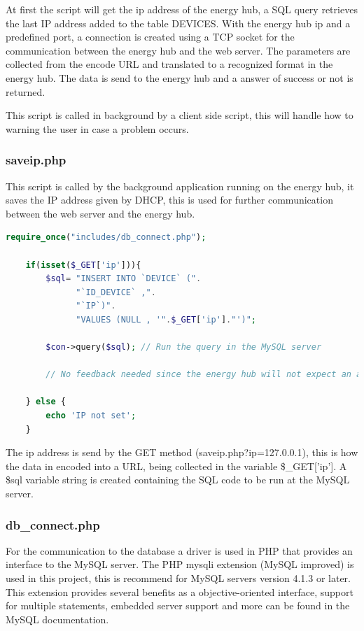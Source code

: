 At first the script will get the ip address of the energy hub, a SQL query retrieves the last IP address added to the table DEVICES. With the energy hub ip and a predefined port, a connection is created using a TCP socket for the communication between the energy hub and the web server. The parameters are collected from the encode URL and translated to a recognized format in the energy hub. The data is send to the energy hub and a answer of success or not is returned.

This script is called in background by a client side script, this will handle how to warning the user in case a problem occurs.

\subsubsection{saveip.php}

This script is called by the background application running on the energy hub, it saves the IP address given by DHCP, this is used for further communication between the web server and the energy hub.
\begin{lstlisting}[language=php]
	require_once("includes/db_connect.php");

	if(isset($_GET['ip'])){
		$sql= "INSERT INTO `DEVICE` (".
			  "`ID_DEVICE` ,".
		  	  "`IP`)".
		  	  "VALUES (NULL , '".$_GET['ip']."')";
	
		$con->query($sql); // Run the query in the MySQL server
		
		// No feedback needed since the energy hub will not expect an answer.
		
	} else {
		echo 'IP not set';
	}
\end{lstlisting}
The ip address is send by the GET method (saveip.php?ip=127.0.0.1), this is how the data in encoded into a URL, being collected in the variable \$\_GET['ip']. 
A \$sql variable string is created containing the SQL code to be run at the MySQL server.

\subsubsection{db\_connect.php}

For the communication to the database a driver is used in PHP that provides an interface to the MySQL server. The PHP mysqli extension (MySQL improved) is used in this project, this is recommend for MySQL servers version 4.1.3 or later. This extension provides several benefits as a objective-oriented interface, support for multiple statements, embedded server support and more can be found in the MySQL documentation.

